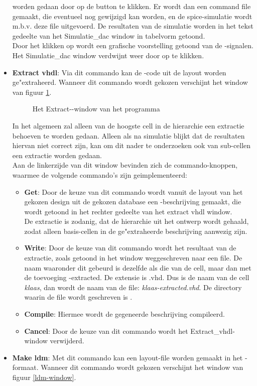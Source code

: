 \begin{itemize}
worden gedaan door op de button  te klikken.
Er wordt dan een command file gemaakt, die eventueel nog gewijzigd kan worden,
en de spice-simulatie wordt m.b.v. deze file uitgevoerd.
De resultaten van de simulatie worden in het tekst gedeelte van het
Simulatie\_dac window in tabelvorm getoond.\\
Door het klikken op  wordt een grafische voorstelling getoond van
de -signalen.\\
Het Simulatie\_dac window verdwijnt weer door op  te klikken.
\item {\bf Extract vhdl}: Via dit commando kan de -code uit de layout worden ge"extraheerd.
  Wanneer dit commando wordt gekozen verschijnt het window van
  figuur \ref{extr-vhdl-window}.
  \begin{figure}[htb]
  \centerline{}
  \caption{Het Extract--window van het programma }
  \label{extr-vhdl-window}
  \end{figure}

  In het algemeen zal alleen van de hoogste cell in de hierarchie een
  extractie behoeven te worden gedaan.
  Alleen als na simulatie blijkt dat de resultaten
  hiervan niet correct zijn, kan om dit nader te onderzoeken
  ook van sub-cellen een extractie worden gedaan.\\
  Aan de linkerzijde van dit window bevinden zich de commando-knoppen, waarmee
  de volgende commando's zijn geimplementeerd:
  \begin{itemize}
  \item {\bf Get}: Door de keuze van dit commando wordt vanuit de layout van het
           gekozen design uit de gekozen  database een -beschrijving
           gemaakt, die wordt getoond in het rechter gedeelte van het
           extract vhdl window.\\
           De extractie is zodanig, dat de hierarchie uit het ontwerp wordt
           gehaald, zodat alleen basis-cellen in de ge"extraheerde beschrijving
           aanwezig zijn.
  \item {\bf Write}: Door de keuze van dit commando wordt het resultaat van de
             extractie, zoals getoond in het window weggeschreven naar een
             file. De naam waaronder dit gebeurd is dezelfde als die van de
             cell, maar dan met de toevoeging -extracted. De extensie is .vhd.
             Dus is de naam van de cell {\it klaas}, dan wordt de naam van
             de file: {\it klaas-extracted.vhd}. De directory waarin de file wordt
             geschreven is .
  \item {\bf Compile}: Hiermee wordt de gegeneerde  beschrijving compileerd.
  \item {\bf Cancel}: Door de keuze van dit commando wordt het Extract\_vhdl-window
                verwijderd.
  \end{itemize}
\item {\bf Make ldm}:
Met dit commando kan een layout-file worden gemaakt in het -formaat.
Wanneer dit commando wordt gekozen verschijnt het window van
figuur \ref{ldm-window}.


\end{itemize}
